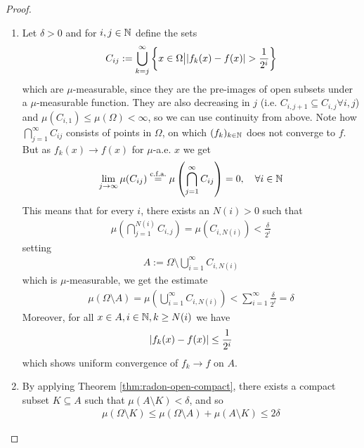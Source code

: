\begin{proof}
  \begin{enumerate}
    \item 
      Let $\delta > 0$ and for $i,j \in \mathbb{N}$ define the sets
      \begin{align*}
        C_{ij} := \bigcup_{k=j}^{\infty} \left\{x \in \Omega \big\vert \vert f_k(x) - f(x)\vert > \frac{1}{2^{i}}\right\}
      \end{align*}
      which are $\mu$-measurable, since they are the pre-images of open subsets under a $\mu$-measurable function.
      They are also decreasing in $j$ (i.e. $C_{i,j + 1} \subseteq C_{i,j} \forall i,j$) and $\mu(C_{i,1}) \leq \mu(\Omega) < \infty$, so we can use continuity from above.
      Note how $\bigcap_{j=1}^{\infty}C_{ij}$ consists of points in $\Omega$, on which $(f_k)_{k \in \mathbb{N}}$ does not converge to $f$.
      But as $f_k(x) \to f(x)$ for $\mu$-a.e. $x$ we get
      \begin{align*}
        \lim_{j \to \infty} \mu(C_{ij}) \stackrel{\text{c.f.a.}}{=} \mu\left(
          \bigcap_{j=1}^{\infty}C_{ij}
        \right)
        = 0, \quad \forall i \in \mathbb{N}
      \end{align*}
      This means that for every $i$, there exists an $N(i) > 0$ such that
      \begin{align*}
        \mu\left(
          \bigcap_{j=1}^{N(i)}C_{i,j}
        \right)
        =
        \mu(C_{i,N(i)})  < \frac{\delta}{2^{i}}
      \end{align*}
      setting
      \begin{align*}
        A := \Omega \setminus \bigcup_{i=1}^{\infty}C_{i,N(i)}
      \end{align*}
      which is $\mu$-measurable, we get the estimate
      \begin{align*}
        \mu(\Omega \setminus A) = \mu \left(
          \bigcup_{i=1}^{\infty}C_{i,N(i)} 
        \right)
        < \sum_{i=1}^{\infty} \frac{\delta}{2^{i}} = \delta
      \end{align*}
      Moreover, for all $x \in A, i \in \mathbb{N}, k \geq N(i)$ we have
      \begin{align*}
        \vert f_k(x) - f(x)\vert \leq \frac{1}{2^{i}}
      \end{align*}
      which shows uniform convergence of $f_k \to f$ on $A$.
    \item 
      By applying Theorem \ref{thm:radon-open-compact}, there exists a compact subset $K \subseteq A$ such that $\mu(A \setminus K) < \delta$, and so
      \begin{align*}
        \mu(\Omega \setminus K) \leq \mu(\Omega \setminus A) + \mu(A \setminus K) \leq 2\delta
      \end{align*}
  \end{enumerate}
\end{proof}

